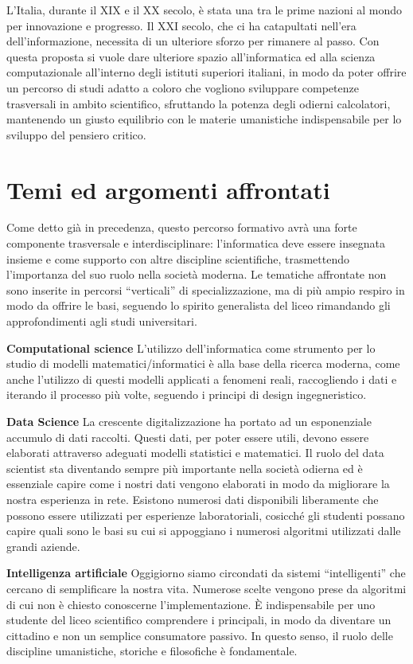 L’Italia, durante il XIX e il XX secolo, è stata una tra le prime nazioni al mondo per innovazione e progresso. Il XXI secolo, che ci ha catapultati nell’era dell’informazione, necessita di un ulteriore sforzo per rimanere al passo. Con questa proposta si vuole dare ulteriore spazio all’informatica ed alla scienza computazionale all’interno degli istituti superiori italiani, in modo da poter offrire un percorso di studi adatto a coloro che vogliono sviluppare competenze trasversali in ambito scientifico, sfruttando la potenza degli odierni calcolatori, mantenendo un giusto equilibrio con le materie umanistiche indispensabile per lo sviluppo del pensiero critico.

\section{Temi ed argomenti affrontati}

Come detto già in precedenza, questo percorso formativo avrà una forte componente trasversale e interdisciplinare: l’informatica deve essere insegnata insieme e come supporto con altre discipline scientifiche, trasmettendo l’importanza del suo ruolo nella società moderna.
Le tematiche affrontate non sono inserite in percorsi “verticali” di specializzazione, ma di più ampio respiro in modo da offrire le basi, seguendo lo spirito generalista del liceo rimandando gli approfondimenti agli studi universitari.

\textbf{Computational science} L’utilizzo dell’informatica come strumento per lo studio di modelli matematici/informatici è alla base della ricerca moderna, come anche l’utilizzo di questi modelli applicati a fenomeni reali, raccogliendo i dati e iterando il processo più volte, seguendo i principi di design ingegneristico.

\textbf{Data Science} La crescente digitalizzazione ha portato ad un esponenziale accumulo di dati raccolti. Questi dati, per poter essere utili, devono essere elaborati attraverso adeguati modelli statistici e matematici. Il ruolo del data scientist sta diventando sempre più importante nella società odierna ed è essenziale capire come i nostri dati vengono elaborati in modo da migliorare la nostra esperienza in rete. Esistono numerosi dati disponibili liberamente che possono essere utilizzati per esperienze laboratoriali, cosicché gli studenti possano capire quali sono le basi su cui si appoggiano i numerosi algoritmi utilizzati dalle grandi aziende.

\textbf{Intelligenza artificiale} Oggigiorno siamo circondati da sistemi “intelligenti” che cercano di semplificare la nostra vita. Numerose scelte vengono prese da algoritmi di cui non è chiesto conoscerne l’implementazione. È indispensabile per uno studente del liceo scientifico comprendere i principali, in modo da diventare un cittadino e non un semplice consumatore passivo.  In questo senso, il ruolo delle discipline umanistiche, storiche e filosofiche è fondamentale.


